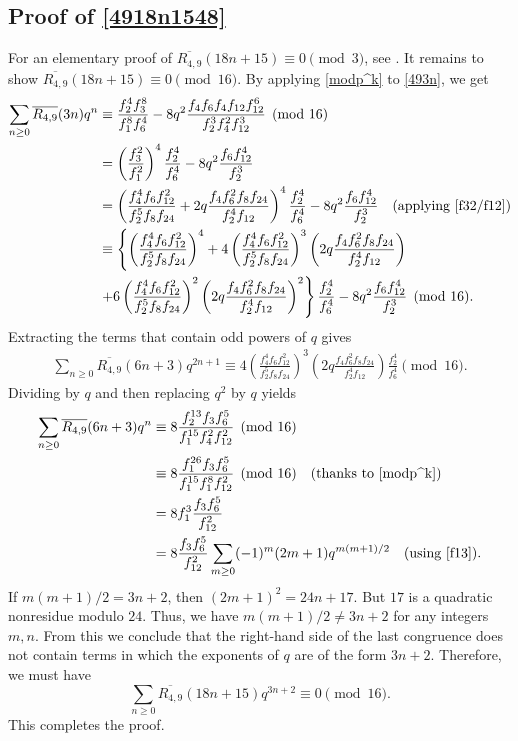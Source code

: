 \documentclass{amsart}
\theoremstyle{definition}
\begin{document}
\subsection*{Proof of \eqref{4918n1548}}
For an elementary proof of $\overline{R_{4,9}}(18n+15)\equiv 0 \pmod{3} $, see \cite[Theorem 5.2]{Ghoshal-Jana}. It remains to show $\overline{R_{4,9}}(18n+15)\equiv 0 \pmod{16}$. By applying \eqref{modp^k} to \eqref{493n}, we get
\begin{align*}
 \sum_{n\geq0}\overline{R_{4,9}}(3n)q^{n}&\equiv\frac{f_2^4 f_3^8}{f_1^8 f_6^4} - 8q^2 \frac{f_4 f_6 f_4 f_{12} f_{12}^6}{f_2^3 f_4^2 f_{12}^3} \pmod{16}\\
 &=\left(\frac{f_3^2}{f_1^2}\right)^4\frac{f_2^4}{f_6^4}-8q^2\frac{f_6f_{12}^4}{f_2^3}\\
 &=\left(\frac{f_4^4f_6f_{12}^2}{f_2^5f_8f_{24}}+2q\frac{f_4f_6^2f_8f_{24}}{f_2^4f_{12}}\right)^4\frac{f_2^4}{f_6^4}-8q^2\frac{f_6f_{12}^4}{f_2^3} \quad \text{(applying \eqref{f32/f12})}\\
 &\equiv\left\{\left(\frac{f_4^4f_6f_{12}^2}{f_2^5f_8f_{24}}\right)^4+4\left(\frac{f_4^4f_6f_{12}^2}{f_2^5f_8f_{24}}\right)^3\left(2q\frac{f_4f_6^2f_8f_{24}}{f_2^4f_{12}}\right)\right.\\
&\left.+6\left(\frac{f_4^4f_6f_{12}^2}{f_2^5f_8f_{24}}\right)^2\left(2q\frac{f_4f_6^2f_8f_{24}}{f_2^4f_{12}}\right)^2\right\}\frac{f_2^4}{f_6^4}-8q^2\frac{f_6f_{12}^4}{f_2^3}\pmod{16}.
\end{align*}
Extracting the terms that contain odd powers of $q$ gives 
\begin{align*}
\sum_{n\geq0}\overline{R_{4,9}}(6n+3)q^{2n+1}\equiv 4\left(\frac{f_4^4f_6f_{12}^2}{f_2^5f_8f_{24}}\right)^3\left(2q\frac{f_4f_6^2f_8f_{24}}{f_2^4f_{12}}\right)\frac{f_2^4}{f_6^4}\pmod{16}.
\end{align*}
Dividing by $q$ and then replacing $q^2$ by $q$ yields
\begin{align*}
   \sum_{n\geq0}\overline{R_{4,9}}(6n+3)q^n&\equiv8 \frac{f_2^{13}f_3f_6^5}{f_1^{15}f_4^2f_{12}^2}\pmod{16}\\
   &\equiv8\frac{f_1^{26}f_3f_6^5}{f_1^{15}f_1^8f_{12}^2} \pmod{16} \quad\text{(thanks to \eqref{modp^k})}\\
   &=8f_1^3\frac{f_3f_6^5}{f_{12}^2}\\
   &=8\frac{f_3f_6^5}{f_{12}^2}\sum_{m\geq0}(-1)^m(2m+1)q^{m(m+1)/2} \quad \text{(using \eqref{f13})}.
\end{align*}
If $m(m+1)/2=3n+2$, then $(2m+1)^2=24n+17$. But $17$ is a quadratic nonresidue modulo $24$. Thus, we have $m(m+1)/2\neq3n+2$ for any integers $m,n$. From this we conclude that the right-hand side of the last congruence does not contain terms in which the exponents of $q$ are of the form $3n+2$. Therefore, we must have $$\sum_{n\geq0}\overline{R_{4,9}}(18n+15)q^{3n+2}\equiv0\pmod{16}.$$
This completes the proof.
\end{document}
